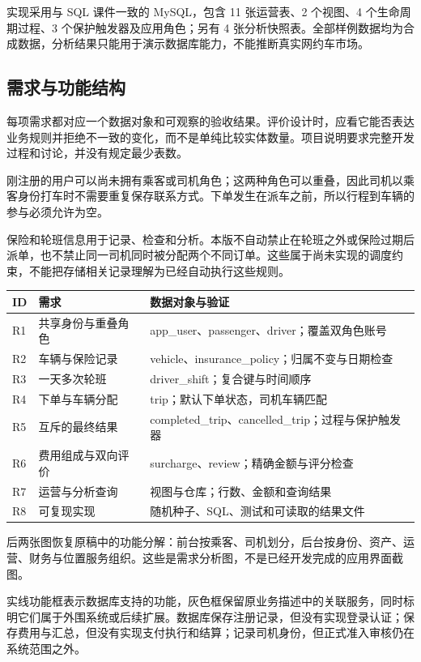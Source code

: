 \documentclass[11pt,a4paper]{article}
\begin{document}
实现采用与 SQL 课件一致的 MySQL，包含 11 张运营表、2 个视图、4 个生命周期过程、3 个保护触发器及应用角色；另有 4 张分析快照表。全部样例数据均为合成数据，分析结果只能用于演示数据库能力，不能推断真实网约车市场。


\subsection{需求与功能结构}
每项需求都对应一个数据对象和可观察的验收结果。评价设计时，应看它能否表达业务规则并拒绝不一致的变化，而不是单纯比较实体数量。项目说明要求完整开发过程和讨论，并没有规定最少表数。

刚注册的用户可以尚未拥有乘客或司机角色；这两种角色可以重叠，因此司机以乘客身份打车时不需要重复保存联系方式。下单发生在派车之前，所以行程到车辆的参与必须允许为空。

保险和轮班信息用于记录、检查和分析。本版不自动禁止在轮班之外或保险过期后派单，也不禁止同一司机同时被分配两个不同订单。这些属于尚未实现的调度约束，不能把存储相关记录理解为已经自动执行这些规则。

\par\begingroup\small\noindent
\begin{tabularx}{\linewidth}{p{.8cm}p{5cm}Y}
\toprule
ID & 需求 & 数据对象与验证\\\midrule
R1 & 共享身份与重叠角色 & app\_\allowbreak{}user、passenger、driver；覆盖双角色账号\\
R2 & 车辆与保险记录 & vehicle、insurance\_\allowbreak{}policy；归属不变与日期检查\\
R3 & 一天多次轮班 & driver\_\allowbreak{}shift；复合键与时间顺序\\
R4 & 下单与车辆分配 & trip；默认下单状态，司机车辆匹配\\
R5 & 互斥的最终结果 & completed\_\allowbreak{}trip、cancelled\_\allowbreak{}trip；过程与保护触发器\\
R6 & 费用组成与双向评价 & surcharge、review；精确金额与评分检查\\
R7 & 运营与分析查询 & 视图与仓库；行数、金额和查询结果\\
R8 & 可复现实现 & 随机种子、SQL、测试和可读取的结果文件\\
\bottomrule
\end{tabularx}
\par\endgroup

后两张图恢复原稿中的功能分解：前台按乘客、司机划分，后台按身份、资产、运营、财务与位置服务组织。这些是需求分析图，不是已经开发完成的应用界面截图。

实线功能框表示数据库支持的功能，灰色框保留原业务描述中的关联服务，同时标明它们属于外围系统或后续扩展。数据库保存注册记录，但没有实现登录认证；保存费用与汇总，但没有实现支付执行和结算；记录司机身份，但正式准入审核仍在系统范围之外。
\end{document}
